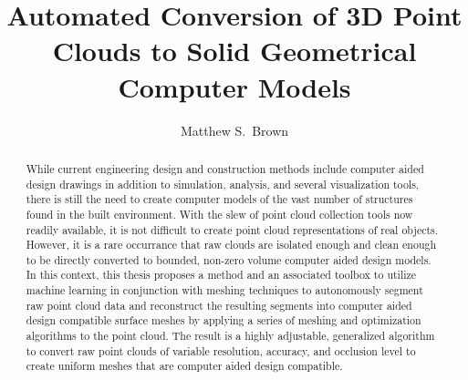 \documentclass[12pt]{drexelthesis}
\title{Automated Conversion of 3D Point Clouds to Solid Geometrical Computer Models}
\author{Matthew S.~Brown}
\begin{document}
\maketitle
\begin{preliminary}

\newpage

\setcounter{page}{2}

\date{} %

\begin{dedication}

\end{dedication}

\begin{acknowledgements}

\end{acknowledgements}


\mytableofcontents\newpage


\setlength{\baselineskip}{0.5\baselineskip}
\listoftables \newpage


\listoffigures \newpage
\setlength{\baselineskip}{2.0\baselineskip}

\begin{abstract}

While current engineering design and construction methods include computer aided design drawings in addition to simulation, analysis, and several visualization tools, there is still the need to create computer models of the vast number of structures found in the built environment. With the slew of point cloud collection tools now readily available, it is not difficult to create point cloud representations of real objects. However, it is a rare occurrance that raw clouds are isolated enough and clean enough to be directly converted to bounded, non-zero volume computer aided design models. In this context, this thesis proposes a method and an associated toolbox to utilize machine learning in conjunction with meshing techniques to autonomously segment raw point cloud data and reconstruct the resulting segments into computer aided design compatible surface meshes by applying a series of meshing and optimization algorithms to the point cloud. The result is a highly adjustable, generalized algorithm to convert raw point clouds of variable resolution, accuracy, and occlusion level to create uniform meshes that are computer aided design compatible.

\end{abstract}

\clearpage
\end{preliminary}
\end{document}
